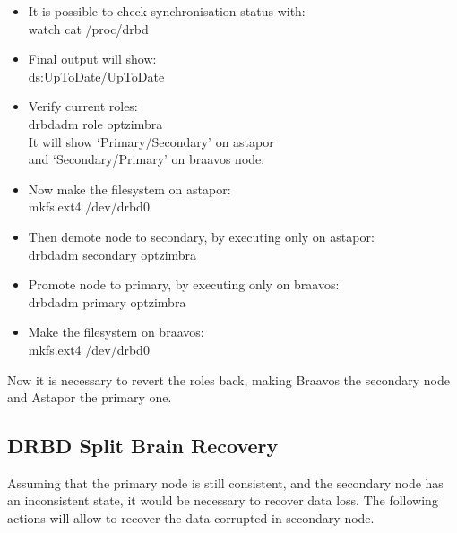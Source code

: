 \documentclass[a4paper, 12pt]{book}
\begin{document}
\begin{itemize}
	\item It is possible to check synchronisation status with:\\
		watch cat /proc/drbd

	\item Final output will show:\\
		ds:UpToDate/UpToDate

	\item Verify current roles:\\
		drbdadm role optzimbra\\
		It will show `Primary/Secondary' on astapor \\
		and `Secondary/Primary' on braavos node.

	\item Now make the filesystem on astapor:\\
		mkfs.ext4 /dev/drbd0

	\item Then demote node to secondary, by executing only on astapor:\\
		drbdadm secondary optzimbra

	\item Promote node to primary, by executing only on braavos:\\
		drbdadm primary optzimbra

	\item Make the filesystem on braavos:\\
		mkfs.ext4 /dev/drbd0

\end{itemize}

\noindent Now it is necessary to revert the roles back, making Braavos the secondary node and Astapor the primary one.


\subsection{DRBD Split Brain Recovery}
\label{sec:splitbrain}

\noindent Assuming that the primary node is still consistent, and the secondary node has an inconsistent state, it would be necessary to recover data loss. The following actions will allow to recover the data corrupted in secondary node.
\end{document}
